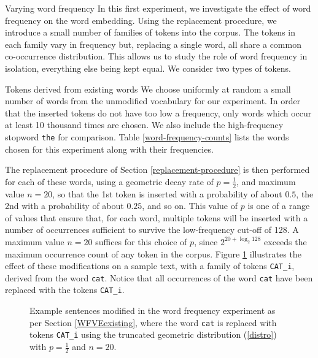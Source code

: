\documentclass{article} %
\newcommand{\word}[1]{\texttt{#1}}
\begin{document}
\begin{section}{Varying word frequency}\label{WFVE}
In this first experiment, we investigate the effect of word frequency on
the word embedding.  Using the replacement procedure, we introduce a
small number of families of tokens into the corpus.  The tokens in each
family vary in frequency but, replacing a single word, all share a
common co-occurrence distribution.  This allows us to study the role of
word frequency in isolation, everything else being kept equal.  We
consider two types of tokens.

\begin{subsection}{Tokens derived from existing words}\label{WFVEexisting}
We choose uniformly at random a small number of words from the
unmodified vocabulary for our experiment.  In order that the inserted
tokens do not have too low a frequency, only words which occur at least
10 thousand times are chosen.  We also include the high-frequency
stopword \word{the} for comparison.  Table \ref{word-frequency-counts}
lists the words chosen for this experiment along with their frequencies.

The replacement procedure of Section \ref{replacement-procedure} is then
performed for each of these words, using a geometric decay rate of $p =
\tfrac{1}{2}$, and maximum value $n=20$, so that the 1st token is
inserted with a probability of about $0.5$, the 2nd with a probability of
about $0.25$, and so on.  This value of $p$ is one of a range of values
that ensure that, for each word, multiple tokens will be inserted with a
number of occurrences sufficient to survive the low-frequency cut-off of
128.  A maximum value $n=20$ suffices for this choice of $p$, since
$2^{20 + \log_2{128}}$ exceeds the maximum occurrence count of any token in
the corpus.  Figure \ref{fig:word-frequency-experiment-text-cat}
illustrates the effect of these modifications on a sample text, with a
family of tokens \word{CAT\_i}, derived from the word \word{cat}.
Notice that all occurrences of the word \word{cat} have been replaced
with the tokens \word{CAT\_i}.

\begin{table}
	
	\caption{Words chosen for the word frequency variation experiment, along with their occurrence counts in the unmodified corpus. }
	\label{word-frequency-counts}
\end{table}

\begin{figure}
	\begin{mdframed}
	
	\end{mdframed}
	\caption{Example sentences modified in the word frequency
          experiment as per Section \ref{WFVEexisting}, where the word
          \word{cat} is replaced with tokens \word{CAT\_i} using the
          truncated geometric distribution (\ref{distro}) with
          $p=\tfrac{1}{2}$ and $n=20$.}
	\label{fig:word-frequency-experiment-text-cat}
\end{figure}


\end{subsection}
\end{section}
\end{document}
